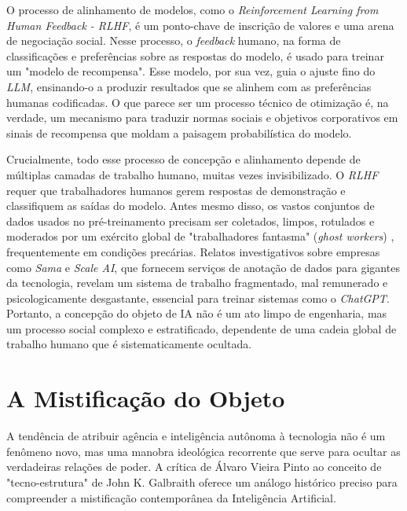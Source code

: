 O processo de alinhamento de modelos, como o \textit{Reinforcement Learning from Human Feedback - RLHF}, é um ponto-chave de inscrição de valores e uma arena de negociação social. 
Nesse processo, o \textit{feedback} humano, na forma de classificações e preferências sobre as respostas do modelo, é usado para treinar um "modelo de recompensa". 
Esse modelo, 
por sua vez, guia o ajuste fino do \textit{LLM}, ensinando-o a produzir resultados que se alinhem com as preferências humanas codificadas. 
O que parece ser um processo técnico de 
otimização é, na verdade, um mecanismo para traduzir normas sociais e objetivos corporativos em sinais de recompensa que moldam a paisagem probabilística do modelo. 

Crucialmente, todo esse processo de concepção e alinhamento depende de múltiplas camadas de trabalho humano, muitas vezes invisibilizado. 
O \textit{RLHF} requer que trabalhadores 
humanos gerem respostas de demonstração e classifiquem as saídas do modelo. 
Antes mesmo disso, os vastos conjuntos de dados usados no pré-treinamento precisam ser coletados, 
limpos, rotulados e moderados por um exército global de "trabalhadores fantasma" (\textit{ghost workers}) \cite{GraySuri2019}, frequentemente em condições precárias. 
Relatos investigativos sobre empresas 
como \textit{Sama} e \textit{Scale AI}, que fornecem serviços de anotação de dados para gigantes da tecnologia, revelam um sistema de trabalho fragmentado, mal remunerado e 
psicologicamente desgastante, essencial para treinar sistemas como o \textit{ChatGPT}. 
Portanto, a concepção do objeto de IA não é um ato limpo de engenharia, mas um processo social 
complexo e estratificado, dependente de uma cadeia global de trabalho humano que é sistematicamente ocultada. 

\section{A Mistificação do Objeto}\label{sec:mistificacao_obj}

A tendência de atribuir agência e inteligência autônoma à tecnologia não é um fenômeno novo, mas uma manobra ideológica recorrente que serve para ocultar as verdadeiras relações 
de poder. 
A crítica de Álvaro Vieira Pinto \cite{VieiraPinto2005} ao conceito de "tecno-estrutura" de John K. Galbraith oferece um análogo histórico preciso para compreender a mistificação 
contemporânea da Inteligência Artificial. 

